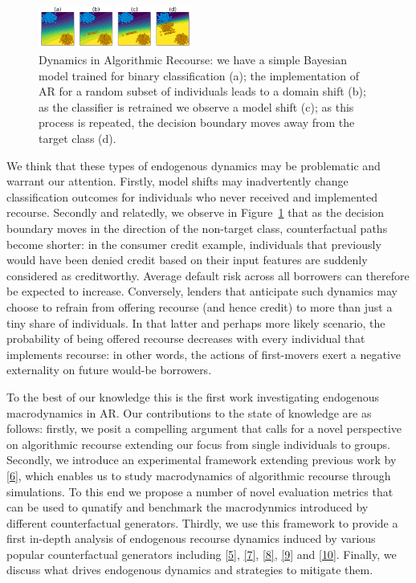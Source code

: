 \documentclass[
  conference]{IEEEtran}
\begin{document}
\begin{figure}

{\centering \includegraphics[width=0.45\textwidth,height=\textheight]{www/poc.png}

}

\caption{\label{fig-poc}Dynamics in Algorithmic Recourse: we have a
simple Bayesian model trained for binary classification (a); the
implementation of AR for a random subset of individuals leads to a
domain shift (b); as the classifier is retrained we observe a model
shift (c); as this process is repeated, the decision boundary moves away
from the target class (d).}

\end{figure}

We think that these types of endogenous dynamics may be problematic and
warrant our attention. Firstly, model shifts may inadvertently change
classification outcomes for individuals who never received and
implemented recourse. Secondly and relatedly, we observe in
Figure~\ref{fig-poc} that as the decision boundary moves in the
direction of the non-target class, counterfactual paths become shorter:
in the consumer credit example, individuals that previously would have
been denied credit based on their input features are suddenly considered
as creditworthy. Average default risk across all borrowers can therefore
be expected to increase. Conversely, lenders that anticipate such
dynamics may choose to refrain from offering recourse (and hence credit)
to more than just a tiny share of individuals. In that latter and
perhaps more likely scenario, the probability of being offered recourse
decreases with every individual that implements recourse: in other
words, the actions of first-movers exert a negative externality on
future would-be borrowers.

To the best of our knowledge this is the first work investigating
endogenous macrodynamics in AR. Our contributions to the state of
knowledge are as follows: firstly, we posit a compelling argument that
calls for a novel perspective on algorithmic recourse extending our
focus from single individuals to groups. Secondly, we introduce an
experimental framework extending previous work by
\protect\hyperlink{ref-altmeyer2022CounterfactualExplanations}{{[}6{]}},
which enables us to study macrodynamics of algorithmic recourse through
simulations. To this end we propose a number of novel evaluation metrics
that can be used to qunatify and benchmark the macrodynmics introduced
by different counterfactual generators. Thirdly, we use this framework
to provide a first in-depth analysis of endogenous recourse dynamics
induced by various popular counterfactual generators including
\protect\hyperlink{ref-wachter2017counterfactual}{{[}5{]}},
\protect\hyperlink{ref-schut2021generating}{{[}7{]}},
\protect\hyperlink{ref-joshi2019towards}{{[}8{]}},
\protect\hyperlink{ref-mothilal2020explaining}{{[}9{]}} and
\protect\hyperlink{ref-antoran2020getting}{{[}10{]}}. Finally, we
discuss what drives endogenous dynamics and strategies to mitigate them.
\end{document}
